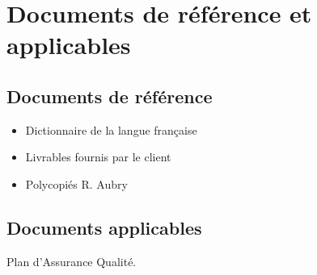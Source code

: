 
\section{Documents de référence et applicables}
    
    \subsection{Documents de référence}
\begin{itemize}
   \item Dictionnaire de la langue française
   \item Livrables fournis par le client
   \item Polycopiés R. Aubry
\end{itemize}

    \subsection{Documents applicables}
        Plan d'Assurance Qualité.
